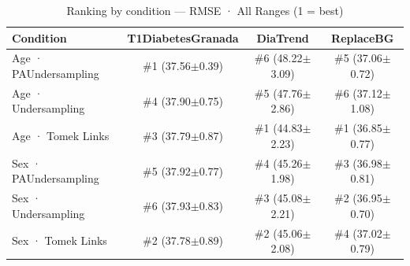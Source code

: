 \begin{table}[htbp]
\centering
\small
\caption{Ranking by condition — RMSE · All Ranges  (1 = best)}
\label{tab:ranking_rmse_entire_family_size_undersampling}
\begin{tabular}{lccc}
\toprule
\textbf{Condition} & \textbf{T1DiabetesGranada} & \textbf{DiaTrend} & \textbf{ReplaceBG} \\
\midrule
Age · PAUndersampling & \#1 (37.56$\pm$0.39) & \#6 (48.22$\pm$3.09) & \#5 (37.06$\pm$0.72) \\
Age · Undersampling & \#4 (37.90$\pm$0.75) & \#5 (47.76$\pm$2.86) & \#6 (37.12$\pm$1.08) \\
Age · Tomek Links & \#3 (37.79$\pm$0.87) & \#1 (44.83$\pm$2.23) & \#1 (36.85$\pm$0.77) \\
\midrule
Sex · PAUndersampling & \#5 (37.92$\pm$0.77) & \#4 (45.26$\pm$1.98) & \#3 (36.98$\pm$0.81) \\
Sex · Undersampling & \#6 (37.93$\pm$0.83) & \#3 (45.08$\pm$2.21) & \#2 (36.95$\pm$0.70) \\
Sex · Tomek Links & \#2 (37.78$\pm$0.89) & \#2 (45.06$\pm$2.08) & \#4 (37.02$\pm$0.79) \\
\bottomrule
\end{tabular}
\end{table}